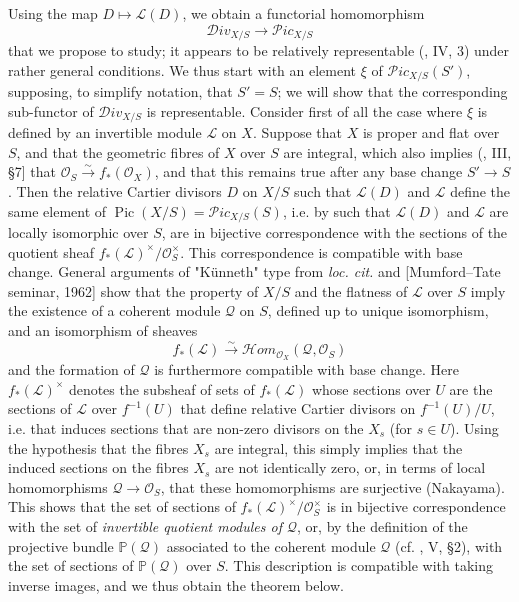 Using the map $D\mapsto\mathcal{L}(D)$, we obtain a functorial homomorphism
\[
    \mathcal{D}iv_{X/S} \to \mathcal{P}ic_{X/S} \tag{+}
\]
that we propose to study;
it appears to be relatively representable (\cite{Gro1960a}, IV, 3) under rather general conditions.
We thus start with an element $\xi$ of $\mathcal{P}ic_{X/S}(S')$, supposing, to simplify notation, that $S'=S$;
we will show that the corresponding sub-functor of $\mathcal{D}iv_{X/S}$ is representable.
Consider first of all the case where $\xi$ is defined by an invertible module $\mathcal{L}$ on $X$.
Suppose that $X$ is proper and flat over $S$, and that the geometric fibres of $X$ over $S$ are integral, which also implies (\cite{GD1960}, III, §7] that $\mathcal{O}_S\xrightarrow{\sim} f_*(\mathcal{O}_X)$, and that this remains true after any base change $S'\to S$.
Then the relative Cartier divisors $D$ on $X/S$ such that $\mathcal{L}(D)$ and $\mathcal{L}$ define the same element of $\operatorname{Pic}(X/S)=\mathcal{P}ic_{X/S}(S)$, i.e. by  such that $\mathcal{L}(D)$ and $\mathcal{L}$ are locally isomorphic over $S$, are in bijective correspondence with the sections of the quotient sheaf $f_*(\mathcal{L})^{\times}/\mathcal{O}_S^\times$.
This correspondence is compatible with base change.
General arguments of "Künneth" type from \emph{loc. cit.} and [Mumford–Tate seminar, 1962] show that the property of $X/S$ and the flatness of $\mathcal{L}$ over $S$ imply the existence of a coherent module $\mathcal{Q}$ on $S$, defined up to unique isomorphism, and an isomorphism of sheaves
\[
    f_*(\mathcal{L}) \xrightarrow{\sim} \mathcal{H}om_{\mathcal{O}_X}(\mathcal{Q},\mathcal{O}_S)
\]
and the formation of $\mathcal{Q}$ is furthermore compatible with base change.
Here $f_*(\mathcal{L})^\times$ denotes the subsheaf of sets of $f_*(\mathcal{L})$ whose sections over $U$ are the sections of $\mathcal{L}$ over $f^{-1}(U)$ that define relative Cartier divisors on $f^{-1}(U)/U$, i.e. that induces sections that are non-zero divisors on the $X_s$ (for $s\in U$).
Using the hypothesis that the fibres $X_s$ are integral, this simply implies that the induced sections on the fibres $X_s$ are not identically zero, or, in terms of local homomorphisms $\mathcal{Q}\to\mathcal{O}_S$, that these homomorphisms are surjective (Nakayama).
This shows that the set of sections of $f_*(\mathcal{L})^{\times}/\mathcal{O}_S^\times$ is in bijective correspondence with the set of \emph{invertible quotient modules of $\mathcal{Q}$}, or, by the definition of the projective bundle $\mathbb{P}(\mathcal{Q})$ associated to the coherent module $\mathcal{Q}$ (cf. \cite{Gro1960a}, V, §2), with the set of sections of $\mathbb{P}(\mathcal{Q})$ over $S$.
This description is compatible with taking inverse images, and we thus obtain the theorem below.

